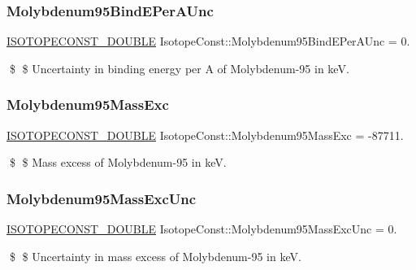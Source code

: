 \subsubsection{\texorpdfstring{Molybdenum95\+Bind\+E\+Per\+A\+Unc}{Molybdenum95BindEPerAUnc}}
{\footnotesize\ttfamily \mbox{\hyperlink{group___isotope_const-_macros_ga8f45a7272ce02c0b4c65c44636ed719a}{I\+S\+O\+T\+O\+P\+E\+C\+O\+N\+S\+T\+\_\+\+D\+O\+U\+B\+LE}} Isotope\+Const\+::\+Molybdenum95\+Bind\+E\+Per\+A\+Unc = 0.}

\$ \$ Uncertainty in binding energy per A of Molybdenum-\/95 in keV. \mbox{\label{group___isotope_const-_molybdenum-_mo95_ga654db3613f1bb1b5b3094287f0e776a0}} 
\subsubsection{\texorpdfstring{Molybdenum95\+Mass\+Exc}{Molybdenum95MassExc}}
{\footnotesize\ttfamily \mbox{\hyperlink{group___isotope_const-_macros_ga8f45a7272ce02c0b4c65c44636ed719a}{I\+S\+O\+T\+O\+P\+E\+C\+O\+N\+S\+T\+\_\+\+D\+O\+U\+B\+LE}} Isotope\+Const\+::\+Molybdenum95\+Mass\+Exc = -\/87711.}

\$ \$ Mass excess of Molybdenum-\/95 in keV. \mbox{\label{group___isotope_const-_molybdenum-_mo95_ga4d4376796a23e1d6599a68e6fd516b23}} 
\subsubsection{\texorpdfstring{Molybdenum95\+Mass\+Exc\+Unc}{Molybdenum95MassExcUnc}}
{\footnotesize\ttfamily \mbox{\hyperlink{group___isotope_const-_macros_ga8f45a7272ce02c0b4c65c44636ed719a}{I\+S\+O\+T\+O\+P\+E\+C\+O\+N\+S\+T\+\_\+\+D\+O\+U\+B\+LE}} Isotope\+Const\+::\+Molybdenum95\+Mass\+Exc\+Unc = 0.}

\$ \$ Uncertainty in mass excess of Molybdenum-\/95 in keV. \mbox{\label{group___isotope_const-_molybdenum-_mo95_gad40c3059d6fc7fb50127155bd7d65b71}} 
